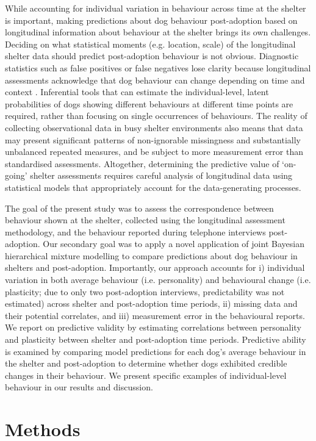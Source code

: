 \documentclass[fleqn,10pt]{wlscirep}
\begin{document}
While accounting for individual variation in behaviour across time at the shelter is important, making predictions about dog behaviour post-adoption based on longitudinal information about behaviour at the shelter brings its own challenges. Deciding on what statistical moments (e.g. location, scale) of the longitudinal shelter data should predict post-adoption behaviour is not obvious. Diagnostic statistics such as false positives or false negatives lose clarity because longitudinal assessments acknowledge that dog behaviour can change depending on time and context \cite{goold2017modelling}. Inferential tools that can estimate the individual-level, latent probabilities of dogs showing different behaviours at different time points are required, rather than focusing on single occurrences of behaviours. The reality of collecting observational data in busy shelter environments also means that data may present significant patterns of non-ignorable missingness and substantially unbalanced repeated measures, and be subject to more measurement error than standardised assessments. Altogether, determining the predictive value of `on-going' shelter assessments requires careful analysis of longitudinal data using statistical models that appropriately account for the data-generating processes.

The goal of the present study was to assess the correspondence between behaviour shown at the shelter, collected using the longitudinal assessment methodology, and the behaviour reported during telephone interviews post-adoption. Our secondary goal was to apply a novel application of joint Bayesian hierarchical mixture modelling to compare predictions about dog behaviour in shelters and post-adoption. Importantly, our approach accounts for i) individual variation in both average behaviour (i.e. personality) and behavioural change (i.e. plasticity; due to only two post-adoption interviews, predictability was not estimated) across shelter and post-adoption time periods, ii) missing data and their potential correlates, and iii) measurement error in the behavioural reports. We report on predictive validity by estimating correlations between personality and plasticity between shelter and post-adoption time periods. Predictive ability is examined by comparing model predictions for each dog's average behaviour in the shelter and post-adoption to determine whether dogs exhibited credible changes in their behaviour. We present specific examples of individual-level behaviour in our results and discussion.

\section*{Methods}
\end{document}
